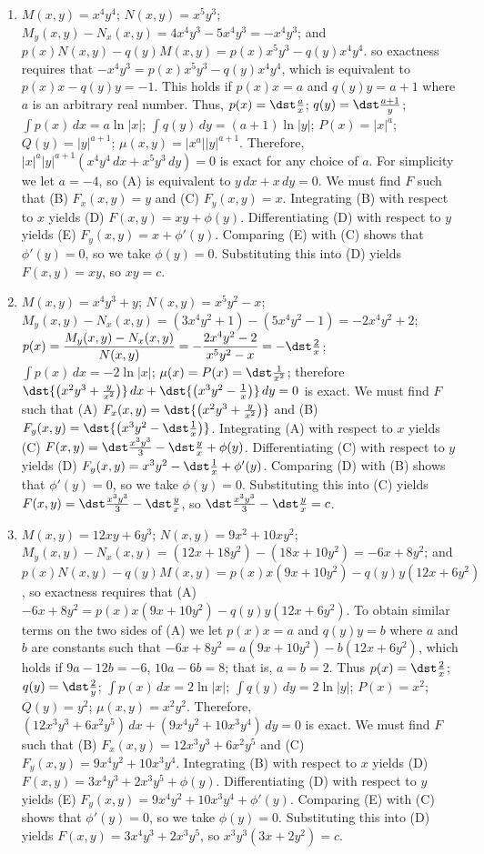 \documentclass[openany]{book}
\newenvironment{sectionSolutions}{
 \begin{enumerate}[item-label={\thesection.\arabic{enumi}.}]
}{
 \end{enumerate}
}
\begin{document}
\begin{sectionSolutions}
\item
$M(x,y)=x^4y^4$;\;
$N(x,y)=x^5y^3$;\;
 $M_y(x,y)-N_x(x,y)=4x^4y^3-5x^4y^3=-x^4y^3$;
and  $p(x)N(x,y)-q(y)M(x,y)=p(x)x^5y^3-q(y)x^4y^4$.
so exactness requires that
 $-x^4y^3=p(x)x^5y^3-q(y)x^4y^4$, which is equivalent to
 $p(x)x-q(y)y=-1$. This holds if
 $p(x)x=a$ and $q(y)y=a+1$  where $a$ is an arbitrary real number.
Thus,
 $p(x)=\dst\frac{a}{ x}$;\;
 $q(y)=\dst\frac{a+1}{ y}$;\;
$\int p(x)\,dx=a\ln|x|$;\;
$\int q(y)\,dy=(a+1)\ln|y|$;\;
$P(x)=|x|^a$;
$Q(y)=|y|^{a+1}$;
$\mu(x,y)=|x^a||y|^{a+1}$.
Therefore,
$|x|^a|y|^{a+1}\left(x^4y^4\,dx+x^5y^3\,dy\right)=0$
is exact for any choice of $a$. For simplicity we let $a=-4$,
so (A)  is equivalent to $y\,dx+x\,dy=0$.
We must find $F$ such that
(B) $F_x(x,y)=y$ and
(C) $F_y(x,y)=x$.
Integrating (B) with respect to $x$ yields
(D) $F(x,y)=xy+\phi(y)$.
Differentiating (D) with respect to $y$  yields
(E) $F_y(x,y)=x+\phi'(y)$.
Comparing (E) with (C)  shows that
$\phi'(y)=0$, so we take
$\phi(y)=0$.
Substituting this into (D) yields
$F(x,y)=xy$,
so $xy=c$.


\item
$M(x,y)=x^4y^3+y$;\;
$N(x,y)=x^5y^2-x$;\;
$M_y(x,y)-N_x(x,y)=(3x^4y^2+1)-(5x^4y^2-1)=-2x^4y^2+2$;\;
$p(x)=\dfrac{M_y(x,y)-N_x(x,y)}{ N(x,y)}=-\dfrac{2x^4y^2-2
}{ x^5y^2-x}=-\dst\frac{2}{ x}$;\;
$\int p(x)\,dx=-2\ln|x|$;\;
$\mu(x)=P(x)=\dst\frac{1}{ x^2}$;
therefore
$\dst{\left(x^2y^3+\frac{y}{ x^2}\right)}\,dx+
\dst{\left(x^3y^2-\frac{1}{ x}\right)}\,dy=0$
is exact.
We must find $F$ such that
(A) $F_x(x,y)=\dst{\left(x^2y^3+\frac{y}{ x^2}\right)}$ and
(B) $F_y(x,y)=\dst{\left(x^3y^2-\dst\frac{1}{ x}\right)}$.
Integrating (A) with respect to $x$ yields
(C) $F(x,y)=\dst\frac{x^3y^3}{3}-\dst\frac{y}{ x}+\phi(y)$.
Differentiating (C) with respect to $y$  yields
(D) $F_y(x,y)=x^3y^2-\dst\frac{1}{ x}+\phi'(y)$.
Comparing (D) with (B)  shows that
$\phi'(y)=0$, so we take
$\phi(y)=0$.
Substituting this into (C) yields
$F(x,y)=\dst\frac{x^3y^3}{3}-\dst\frac{y}{ x}$,
so $\dst\frac{x^3y^3}{3}-\dst\frac{y}{ x}=c$.


\item
$M(x,y)=12xy+6y^3$;\;
$N(x,y)=9x^2+10xy^2$;\;
 $M_y(x,y)-N_x(x,y)=(12x+18y^2)-(18x+10y^2)=-6x+8y^2$;
and  $p(x)N(x,y)-q(y)M(x,y)=p(x)x(9x+10y^2)-q(y)y(12x+6y^2)$,
so exactness requires that
(A) $-6x+8y^2=p(x)x(9x+10y^2)-q(y)y(12x+6y^2)$.
To obtain  similar terms on the two sides of (A)
we let  $p(x)x=a$ and $q(y)y=b$  where $a$ and $b$ are constants
such that $-6x+8y^2=a(9x+10y^2)-b(12x+6y^2)$, which holds if
  $9a-12b=-6$, $10a-6b=8$; that is, $a=b=2$. Thus
 $p(x)=\dst\frac{2}{ x}$;\;
 $q(y)=\dst\frac{2}{ y}$;\;
$\int p(x)\,dx=2\ln|x|$;\;
$\int q(y)\,dy=2\ln|y|$;\;
$P(x)=x^2$;
$Q(y)=y^2$;
$\mu(x,y)=x^2y^2$.
Therefore,
$(12x^3y^3+6x^2y^5)\,dx+(9x^4y^2+10x^3y^4)\,dy=0$
is exact.
We must find $F$ such that
(B) $F_x(x,y)=12x^3y^3+6x^2y^5$ and
(C) $F_y(x,y)=9x^4y^2+10x^3y^4$.
Integrating (B) with respect to $x$ yields
(D) $F(x,y)=3x^4y^3+2x^3y^5+\phi(y)$.
Differentiating (D) with respect to $y$  yields
(E) $F_y(x,y)=9x^4y^2+10x^3y^4+\phi'(y)$.
Comparing (E) with (C)  shows that
$\phi'(y)=0$, so we take
$\phi(y)=0$.
Substituting this into (D) yields
$F(x,y)=3x^4y^3+2x^3y^5$,
so $x^3y^3(3x+2y^2)=c$.




\end{sectionSolutions}
\end{document}
